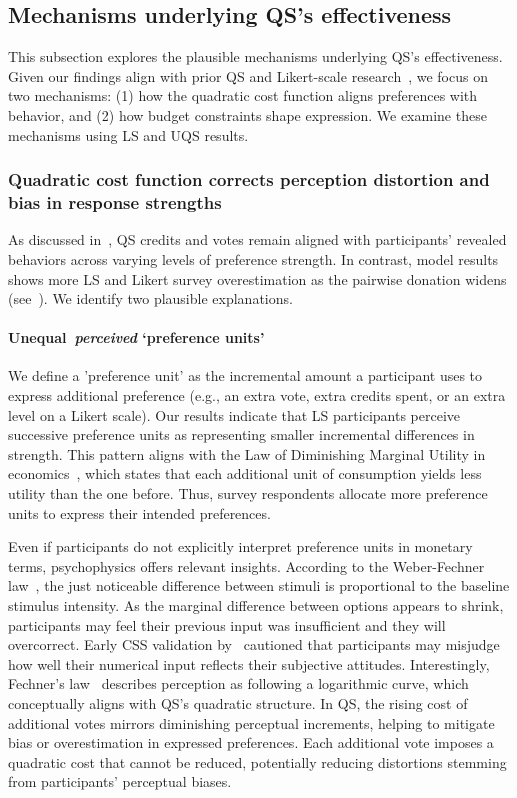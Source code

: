 \subsection{Mechanisms underlying QS's effectiveness}
This subsection explores the plausible mechanisms underlying QS's effectiveness. Given our findings align with prior QS and Likert-scale research~\cite{chengCanShowWhat2021}, we focus on two mechanisms: (1) how the quadratic cost function aligns preferences with behavior, and (2) how budget constraints shape expression. We examine these mechanisms using LS and UQS results.

\subsubsection{Quadratic cost function corrects perception distortion and bias in response strengths}
As discussed in~, QS credits and votes remain aligned with participants' revealed behaviors across varying levels of preference strength. In contrast, model results shows more LS and Likert survey overestimation as the pairwise donation widens (see~). We identify two plausible explanations.

\paragraph{Unequal~\textit{perceived} `preference units'}
We define a 'preference unit' as the incremental amount a participant uses to express additional preference (e.g., an extra vote, extra credits spent, or an extra level on a Likert scale). Our results indicate that LS participants perceive successive preference units as representing smaller incremental differences in strength. This pattern aligns with the Law of Diminishing Marginal Utility in economics~\cite{gossen1983laws, kahnemanProspectTheoryAnalysis1979}, which states that each additional unit of consumption yields less utility than the one before. Thus, survey respondents allocate more preference units to express their intended preferences.

Even if participants do not explicitly interpret preference units in monetary terms, psychophysics offers relevant insights. According to the Weber-Fechner law~\cite{dehaeneNeuralBasisWeber2003, kruegerReconcilingFechnerStevens1989}, the just noticeable difference between stimuli is proportional to the baseline stimulus intensity. As the marginal difference between options appears to shrink, participants may feel their previous input was insufficient and they will overcorrect. Early CSS validation by~\citet{dudekValidityPointAssignmentProcedure1957} cautioned that participants may misjudge how well their numerical input reflects their subjective attitudes. Interestingly, Fechner's law~\cite{kruegerReconcilingFechnerStevens1989} describes perception as following a logarithmic curve, which conceptually aligns with QS's quadratic structure. In QS, the rising cost of additional votes mirrors diminishing perceptual increments, helping to mitigate bias or overestimation in expressed preferences. Each additional vote imposes a quadratic cost that cannot be reduced, potentially reducing distortions stemming from participants' perceptual biases.

